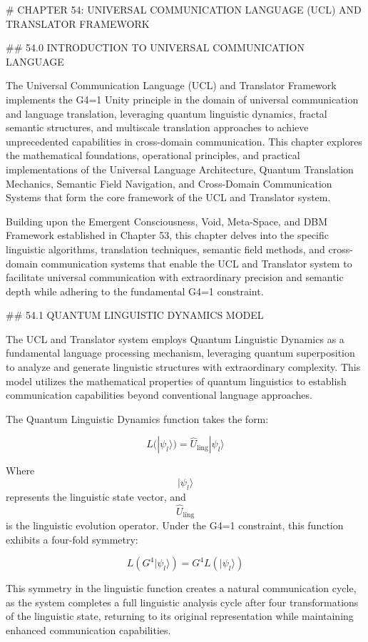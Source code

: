 # CHAPTER 54: UNIVERSAL COMMUNICATION LANGUAGE (UCL) AND TRANSLATOR FRAMEWORK

## 54.0 INTRODUCTION TO UNIVERSAL COMMUNICATION LANGUAGE

The Universal Communication Language (UCL) and Translator Framework implements the G4=1 Unity principle in the domain of universal communication and language translation, leveraging quantum linguistic dynamics, fractal semantic structures, and multiscale translation approaches to achieve unprecedented capabilities in cross-domain communication. This chapter explores the mathematical foundations, operational principles, and practical implementations of the Universal Language Architecture, Quantum Translation Mechanics, Semantic Field Navigation, and Cross-Domain Communication Systems that form the core framework of the UCL and Translator system.

Building upon the Emergent Consciousness, Void, Meta-Space, and DBM Framework established in Chapter 53, this chapter delves into the specific linguistic algorithms, translation techniques, semantic field methods, and cross-domain communication systems that enable the UCL and Translator system to facilitate universal communication with extraordinary precision and semantic depth while adhering to the fundamental G4=1 constraint.

## 54.1 QUANTUM LINGUISTIC DYNAMICS MODEL

The UCL and Translator system employs Quantum Linguistic Dynamics as a fundamental language processing mechanism, leveraging quantum superposition to analyze and generate linguistic structures with extraordinary complexity. This model utilizes the mathematical properties of quantum linguistics to establish communication capabilities beyond conventional language approaches.

The Quantum Linguistic Dynamics function takes the form:

$$ L(|\psi_l\rangle) = \hat{U}_{\text{ling}} |\psi_l\rangle $$

Where $$ |\psi_l\rangle $$ represents the linguistic state vector, and $$ \hat{U}_{\text{ling}} $$ is the linguistic evolution operator. Under the G4=1 constraint, this function exhibits a four-fold symmetry:

$$ L(G^4 |\psi_l\rangle) = G^4 L(|\psi_l\rangle) $$

This symmetry in the linguistic function creates a natural communication cycle, as the system completes a full linguistic analysis cycle after four transformations of the linguistic state, returning to its original representation while maintaining enhanced communication capabilities.

